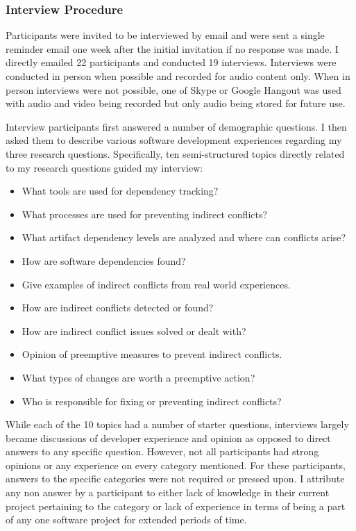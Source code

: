 \subsubsection{Interview Procedure}

Participants were invited to be interviewed by email and were sent a single reminder email one week
after the initial invitation if no response was made. I directly emailed 22 participants and  conducted
19 interviews. Interviews were conducted in person when possible and recorded for audio content only. When in person
interviews were not possible, one of Skype or Google Hangout was used with audio and video being recorded but only
audio being stored for future use. 

Interview participants first answered a number of demographic questions. I then asked them to describe various software development experiences regarding my three research questions.
Specifically, ten semi-structured topics directly related to my research questions guided my interview: 


\begin{itemize}
\item What tools are used for dependency tracking?
\item What processes are used for preventing indirect conflicts?
\item What artifact dependency levels are analyzed and where can conflicts arise?
\item How are software dependencies found?
\item Give examples of indirect conflicts from real world experiences.
\item How are indirect conflicts detected or found?
\item How are indirect conflict issues solved or dealt with?
\item Opinion of preemptive measures to prevent indirect conflicts.
\item What types of changes are worth a preemptive action?
\item Who is responsible for fixing or preventing indirect conflicts?
\end{itemize}

While each of the 10 topics had a number of starter questions, interviews 
largely became discussions of developer experience and opinion as opposed to direct answers to any specific question.
However, not all participants had strong opinions or any experience on every category mentioned. For these participants, answers 
to the specific categories were not required or pressed upon. I attribute any non answer by a participant to
either lack of knowledge in their current project pertaining to the category or lack of experience in terms of
being a part of any one software project for extended periods of time. 

